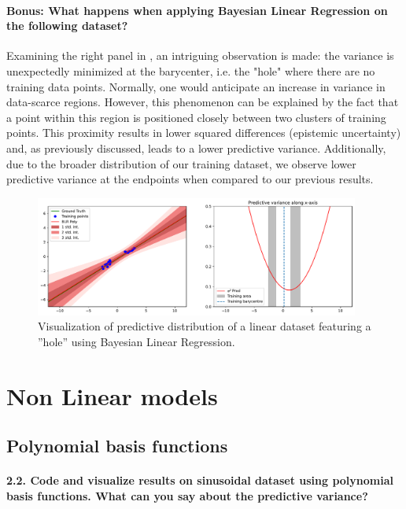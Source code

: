 \paragraph*{Bonus: What happens when applying Bayesian Linear Regression on the following dataset?}

Examining the right panel in , an intriguing observation is made: the variance is unexpectedly minimized at the barycenter, i.e. the "hole" where there are no training data points. Normally, one would anticipate an increase in variance in data-scarce regions. However, this phenomenon can be explained by the fact that a point within this region is positioned closely between two clusters of training points. This proximity results in lower squared differences (epistemic uncertainty) and, as previously discussed, leads to a lower predictive variance. Additionally, due to the broader distribution of our training dataset, we observe lower predictive variance at the endpoints when compared to our previous results.

\begin{figure}[H]
    \centering
    \includegraphics[width=0.95\textwidth]{phi_linear_hole.pdf}
    \caption{Visualization of predictive distribution of a linear dataset featuring a ''hole'' using Bayesian Linear Regression.}
    \label{fig:phi_linear_hole}
\end{figure}

\section{Non Linear models}

\subsection{Polynomial basis functions}

\paragraph*{2.2. Code and visualize results on sinusoidal dataset using polynomial basis functions. What can you say about the predictive variance?}

